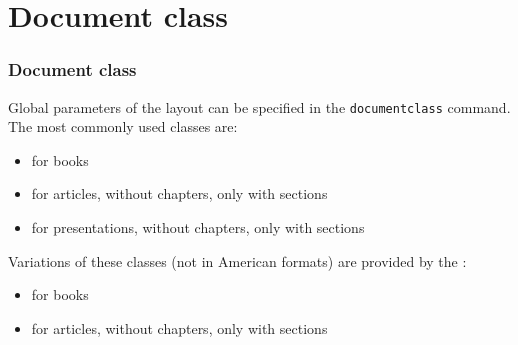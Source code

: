 \section{Document class}

\begin{frame}[fragile]
\frametitle{Document class}

Global parameters of the layout can be specified in the \lstinline|documentclass| command. The most commonly used classes are:
 
\begin{itemize}
	\item {} for books
	\item {} for articles, without chapters, only with sections
	\item {} for presentations, without chapters, only with sections
\end{itemize}

\pause 

Variations of these classes (not in American formats) are provided by the \textbf{}:

\begin{itemize}
	\item {} for books
	\item \alert{} for articles, without chapters, only with sections
\end{itemize}


\end{frame}


